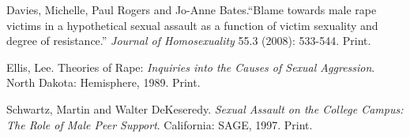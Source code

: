 \begin{workscited}
	
\bibent
Davies, Michelle, Paul Rogers and Jo-Anne Bates.``Blame towards male rape victims in a hypothetical sexual assault as a function of victim sexuality and degree of resistance.'' \textit{Journal of Homosexuality} 55.3 (2008): 533-544. Print.


\bibent
Ellis, Lee. Theories of Rape: \textit{Inquiries into the Causes of Sexual Aggression}. North Dakota: Hemisphere, 1989. Print.

\bibent
Schwartz, Martin and Walter DeKeseredy. \textit{Sexual Assault on the College Campus: The Role of Male Peer Support}. California: SAGE, 1997. Print.

\end{workscited}
